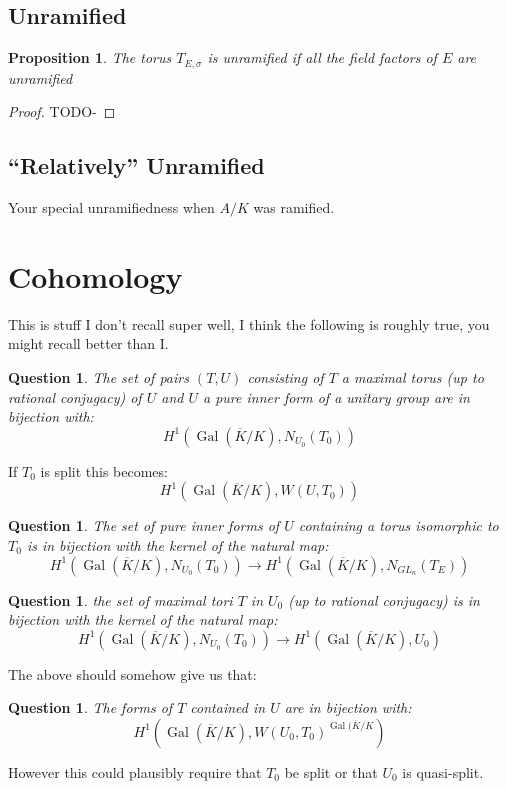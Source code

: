 \documentclass{article}
\theoremstyle{plain}
\newtheorem{proposition}[theorem]{Proposition}
\newtheorem{question}[theorem]{Question}
\theoremstyle{definition}
\DeclareMathOperator{\Gal}{Gal}
\begin{document}
\subsection{Unramified}

\begin{proposition}
The torus $T_{E,\sigma}$ is unramified if all the field factors of $E$ are unramified
\end{proposition}
\begin{proof}
TODO-
\end{proof}


\subsection{``Relatively'' Unramified}

Your special unramifiedness when $A/K$ was ramified.

\section{Cohomology}

This is stuff I don't recall super well, I think the following is roughly true, you might recall better than I.

\begin{question}
The set of pairs $(T,U)$ consisting of $T$ a maximal torus (up to rational conjugacy) of $U$ and $U$ a pure inner form of a unitary group are in bijection with:
\[ H^1( \Gal(\overline{K}/K), N_{U_0}(T_0) ) \]
\end{question}
If $T_0$ is split this becomes:
\[ H^1( \Gal(\overline{K}/K), W(U,T_0) ) \]

\begin{question}
The set of pure inner forms of $U$ containing a torus isomorphic to $T_0$ is in bijection with the kernel of the natural map:
\[ H^1( \Gal(\overline{K}/K), N_{U_0}(T_0) ) \rightarrow H^1( \Gal(\overline{K}/K),N_{GL_n}(T_E )) \]
\end{question}

\begin{question}
the set of maximal tori $T$ in $U_0$ (up to rational conjugacy) is in bijection with the kernel of the natural map:
\[  H^1( \Gal(\overline{K}/K), N_{U_0}(T_0) ) \rightarrow H^1( \Gal(\overline{K}/K), U_0) \]
\end{question}

The above should somehow give us that:
\begin{question}
The forms of $T$ contained in $U$ are in bijection with:
\[ H^1(\Gal(\overline{K}/K), W(U_0,T_0)^{\Gal(\overline{K}/K} ) \]
\end{question}
However this could plausibly require that $T_0$ be split or that $U_0$ is quasi-split.
\end{document}
